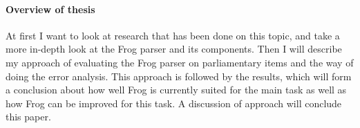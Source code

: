 \paragraph{Overview of thesis}
At first I want to look at research that has been done on this topic, and take a more in-depth look at the Frog parser and its components. Then I will describe my approach of evaluating the Frog parser on parliamentary items and the way of doing the error analysis. This approach is followed by the results, which will form a conclusion about how well Frog is currently suited for the main task as well as how Frog can be improved for this task. A discussion of approach will conclude this paper.

